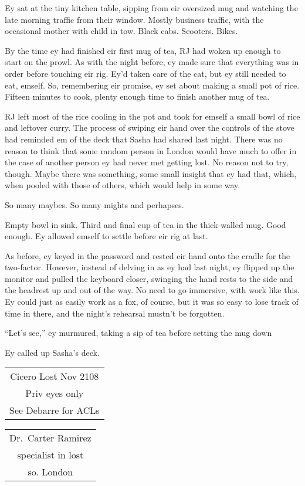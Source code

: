Ey sat at the tiny kitchen table, sipping from eir oversized mug and watching the late morning traffic from their window. Mostly business traffic, with the occasional mother with child in tow. Black cabs. Scooters. Bikes.

By the time ey had finished eir first mug of tea, RJ had woken up enough to start on the prowl. As with the night before, ey made sure that everything was in order before touching eir rig. Ey'd taken care of the cat, but ey still needed to eat, emself. So, remembering eir promise, ey set about making a small pot of rice. Fifteen minutes to cook, plenty enough time to finish another mug of tea.

RJ left most of the rice cooling in the pot and took for emself a small bowl of rice and leftover curry. The process of swiping eir hand over the controls of the stove had reminded em of the deck that Sasha had shared last night. There was no reason to think that some random person in London would have much to offer in the case of another person ey had never met getting lost. No reason not to try, though. Maybe there was something, some small insight that ey had that, which, when pooled with those of others, which would help in some way.

So many maybes. So many mights and perhapses.

Empty bowl in sink. Third and final cup of tea in the thick-walled mug. Good enough. Ey allowed emself to settle before eir rig at last.

As before, ey keyed in the password and rested eir hand onto the cradle for the two-factor. However, instead of delving in as ey had last night, ey flipped up the monitor and pulled the keyboard closer, swinging the hand rests to the side and the headrest up and out of the way. No need to go immersive, with work like this. Ey could just as easily work as a fox, of course, but it was so easy to lose track of time in there, and the night's rehearsal mustn't be forgotten.

``Let's see,'' ey murmured, taking a sip of tea before setting the mug down

Ey called up Sasha's deck.

\begin{longtable}[]{@{}c@{}}
\toprule
\endhead
Cicero Lost Nov 2108\tabularnewline
Priv eyes only\tabularnewline
See Debarre for ACLs\tabularnewline
\bottomrule
\end{longtable}

\begin{longtable}[]{@{}c@{}}
\toprule
\endhead
Dr.~Carter Ramirez\tabularnewline
specialist in lost\tabularnewline
so. London\tabularnewline
\bottomrule
\end{longtable}

